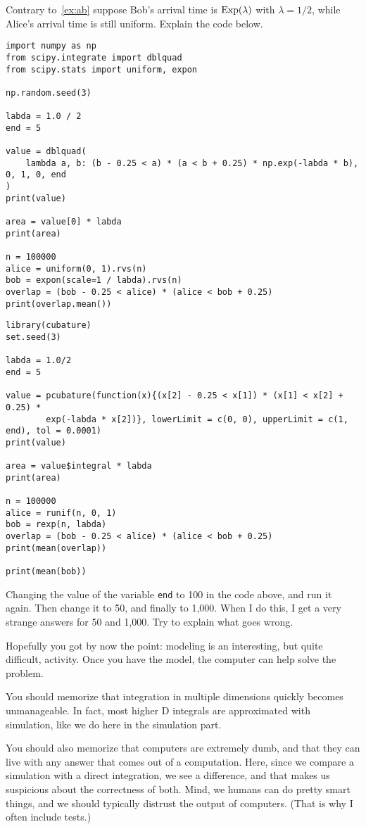 \begin{exercise}
Contrary to~\cref{ex:ab} suppose Bob's arrival time is $\mathrm{Exp}(\lambda)$ with $\lambda=1/2$,  while Alice's arrival time is still uniform.
Explain the code below.
\begin{verbatim}
import numpy as np
from scipy.integrate import dblquad
from scipy.stats import uniform, expon

np.random.seed(3)

labda = 1.0 / 2
end = 5

value = dblquad(
    lambda a, b: (b - 0.25 < a) * (a < b + 0.25) * np.exp(-labda * b), 0, 1, 0, end
)
print(value)

area = value[0] * labda
print(area)

n = 100000
alice = uniform(0, 1).rvs(n)
bob = expon(scale=1 / labda).rvs(n)
overlap = (bob - 0.25 < alice) * (alice < bob + 0.25)
print(overlap.mean())
\end{verbatim}

\begin{verbatim}
library(cubature)
set.seed(3)

labda = 1.0/2
end = 5

value = pcubature(function(x){(x[2] - 0.25 < x[1]) * (x[1] < x[2] + 0.25) * 
		exp(-labda * x[2])}, lowerLimit = c(0, 0), upperLimit = c(1, end), tol = 0.0001)
print(value)

area = value$integral * labda
print(area)

n = 100000
alice = runif(n, 0, 1)
bob = rexp(n, labda)
overlap = (bob - 0.25 < alice) * (alice < bob + 0.25)
print(mean(overlap))

print(mean(bob))
\end{verbatim}

\end{exercise}

\begin{exercise}
Changing the value of the variable \verb|end| to 100 in the code above, and run it again. Then change it to 50, and finally to 1,000.  When I do this, I get a very strange answers for 50 and 1,000. Try to explain what goes wrong.
\end{exercise}


Hopefully you got by now the point: modeling is an interesting, but  quite difficult, activity. Once you have the model, the computer can help solve the problem.


You should memorize that integration in multiple dimensions quickly becomes unmanageable. In fact, most higher D integrals are approximated with simulation, like we do here in the simulation part.

You should also memorize that computers are extremely dumb, and that they can live with any answer that comes out of a computation. Here, since we compare a simulation with a direct integration, we see a difference, and that makes us suspicious about the correctness of both. Mind, we humans can do pretty smart things, and we should typically distrust the output of computers. (That is why I often include tests.)
